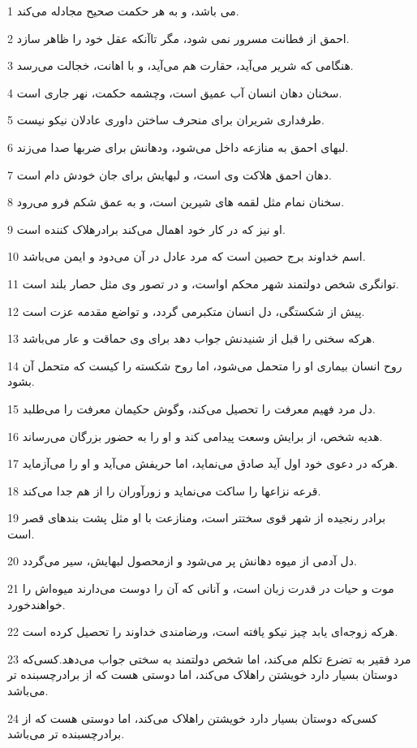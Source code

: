 \par 1 می باشد، و به هر حکمت صحیح مجادله می‌کند.
\par 2 احمق از فطانت مسرور نمی شود، مگر تاآنکه عقل خود را ظاهر سازد.
\par 3 هنگامی که شریر می‌آید، حقارت هم می‌آید، و با اهانت، خجالت می‌رسد.
\par 4 سخنان دهان انسان آب عمیق است، وچشمه حکمت، نهر جاری است.
\par 5 طرفداری شریران برای منحرف ساختن داوری عادلان نیکو نیست.
\par 6 لبهای احمق به منازعه داخل می‌شود، ودهانش برای ضربها صدا می‌زند.
\par 7 دهان احمق هلاکت وی است، و لبهایش برای جان خودش دام است.
\par 8 سخنان نمام مثل لقمه های شیرین است، و به عمق شکم فرو می‌رود.
\par 9 او نیز که در کار خود اهمال می‌کند برادرهلاک کننده است.
\par 10 اسم خداوند برج حصین است که مرد عادل در آن می‌دود و ایمن می‌باشد.
\par 11 توانگری شخص دولتمند شهر محکم اواست، و در تصور وی مثل حصار بلند است.
\par 12 پیش از شکستگی، دل انسان متکبرمی گردد، و تواضع مقدمه عزت است.
\par 13 هر‌که سخنی را قبل از شنیدنش جواب دهد برای وی حماقت و عار می‌باشد.
\par 14 روح انسان بیماری او را متحمل می‌شود، اما روح شکسته را کیست که متحمل آن بشود.
\par 15 دل مرد فهیم معرفت را تحصیل می‌کند، وگوش حکیمان معرفت را می‌طلبد.
\par 16 هدیه شخص، از برایش وسعت پیدامی کند و او را به حضور بزرگان می‌رساند.
\par 17 هر‌که در دعوی خود اول آید صادق می‌نماید، اما حریفش می‌آید و او را می‌آزماید.
\par 18 قرعه نزاعها را ساکت می‌نماید و زورآوران را از هم جدا می‌کند.
\par 19 برادر رنجیده از شهر قوی سختتر است، ومنازعت با او مثل پشت بندهای قصر است.
\par 20 دل آدمی از میوه دهانش پر می‌شود و ازمحصول لبهایش، سیر می‌گردد.
\par 21 موت و حیات در قدرت زبان است، و آنانی که آن را دوست می‌دارند میوه‌اش را خواهندخورد.
\par 22 هر‌که زوجه‌ای یابد چیز نیکو یافته است، ورضامندی خداوند را تحصیل کرده است.
\par 23 مرد فقیر به تضرع تکلم می‌کند، اما شخص دولتمند به سختی جواب می‌دهد.کسی‌که دوستان بسیار دارد خویشتن راهلاک می‌کند، اما دوستی هست که از برادرچسبنده تر می‌باشد.
\par 24 کسی‌که دوستان بسیار دارد خویشتن راهلاک می‌کند، اما دوستی هست که از برادرچسبنده تر می‌باشد.
 
